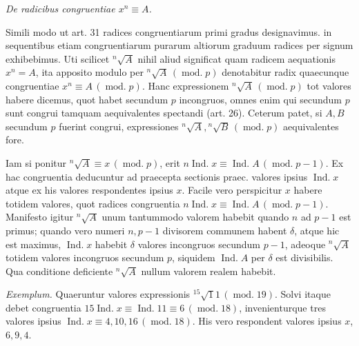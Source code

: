 \begin{center}\emph{De radicibus congruentiae $x^n\equiv A$.}\end{center}

Simili modo ut art. 31 radices congruentiarum primi gradus designavimus. in sequentibus etiam congruentiarum purarum altiorum graduum radices per signum exhibebimus. Uti scilicet ${}^{n}\!\surd A$ nihil aliud significat quam radicem aequationis $x^n=A$, ita apposito modulo per ${}^{n}\!\surd A\,(\operatorname{mod.}p)$ denotabitur radix quaecunque congruentiae $x^n\equiv A\,(\operatorname{mod.}p)$. Hanc expressionem ${}^{n}\!\surd A\,(\operatorname{mod.}p)$ tot valores habere dicemus, quot habet secundum $p$ incongruos, omnes enim qui secundum $p$
sunt congrui tamquam aequivalentes spectandi (art. 26). Ceterum patet, si $A,B$ secundum $p$ fuerint congrui, expressiones ${}^{n}\!\surd A,{}^{n}\!\surd B\,(\operatorname{mod.}p)$ aequivalentes fore.

Iam si ponitur ${}^{n}\!\surd A\equiv x\,(\operatorname{mod.}p)$, erit $n\operatorname{Ind.}x\equiv\operatorname{Ind.}A\,(\operatorname{mod.}p-1)$. Ex hac congruentia deducuntur ad praecepta sectionis praec. valores ipsius $\operatorname{Ind.}x$ atque ex his valores respondentes ipsius $x$. Facile vero perspicitur $x$ habere totidem valores, quot radices congruentia $n\operatorname{Ind.}x\equiv\operatorname{Ind.}A\,(\operatorname{mod.}p-1)$. Manifesto igitur ${}^{n}\!\surd A$ unum tantummodo valorem habebit quando $n$ ad $p-1$ est primus; quando vero numeri $n,p-1$ divisorem communem habent $\delta$, atque hic est maximus, $\operatorname{Ind.}x$ habebit $\delta$ valores incongruos secundum $p-1$, adeoque ${}^{n}\!\surd A$ totidem valores incongruos secundum $p$, siquidem $\operatorname{Ind.}A$ per $\delta$ est divisibilis. Qua conditione deficiente ${}^{n}\!\surd A$ nullum valorem realem habebit.

\emph{Exemplum.} Quaeruntur valores expressionis ${}^{15}\!\surd11\,(\operatorname{mod.}19)$. Solvi itaque debet congruentia $15\operatorname{Ind.}x\equiv\operatorname{Ind.}11\equiv6\,(\operatorname{mod.}18)$, invenienturque tres valores ipsius $\operatorname{Ind.}x\equiv4,10,16\,(\operatorname{mod.}18)$. His vero respondent valores ipsius $x$, $6,9,4$.

